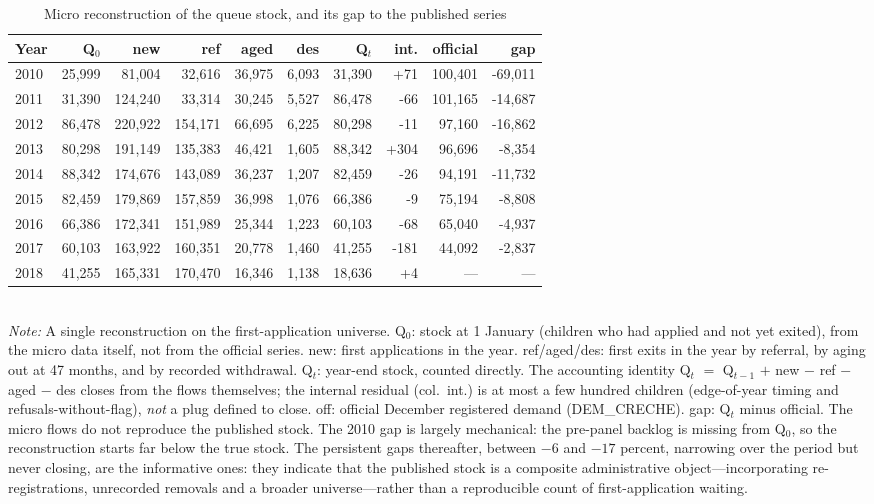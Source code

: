 \begin{table}[htbp]\centering
\caption{Micro reconstruction of the queue stock, and its gap to the published series}
\label{tab:P5queue}
\footnotesize
\setlength{\tabcolsep}{4pt}
\begin{tabular}{lrrrrrrrrr}
\toprule
Year & Q$_0$ & new & ref & aged & des & Q$_t$ & int. & official & gap \\
\midrule
2010 & 25,999 & 81,004 & 32,616 & 36,975 & 6,093 & 31,390 & +71 & 100,401 & -69,011 \\
2011 & 31,390 & 124,240 & 33,314 & 30,245 & 5,527 & 86,478 & -66 & 101,165 & -14,687 \\
2012 & 86,478 & 220,922 & 154,171 & 66,695 & 6,225 & 80,298 & -11 & 97,160 & -16,862 \\
2013 & 80,298 & 191,149 & 135,383 & 46,421 & 1,605 & 88,342 & +304 & 96,696 & -8,354 \\
2014 & 88,342 & 174,676 & 143,089 & 36,237 & 1,207 & 82,459 & -26 & 94,191 & -11,732 \\
2015 & 82,459 & 179,869 & 157,859 & 36,998 & 1,076 & 66,386 & -9 & 75,194 & -8,808 \\
2016 & 66,386 & 172,341 & 151,989 & 25,344 & 1,223 & 60,103 & -68 & 65,040 & -4,937 \\
2017 & 60,103 & 163,922 & 160,351 & 20,778 & 1,460 & 41,255 & -181 & 44,092 & -2,837 \\
2018 & 41,255 & 165,331 & 170,470 & 16,346 & 1,138 & 18,636 & +4 & --- & --- \\
\bottomrule
\end{tabular}
\\[3pt]{\footnotesize \textit{Note:} A single reconstruction on the first-application universe. Q$_0$: stock at 1 January (children who had applied and not yet exited), from the micro data itself, not from the official series. new: first applications in the year. ref/aged/des: first exits in the year by referral, by aging out at 47 months, and by recorded withdrawal. Q$_t$: year-end stock, counted directly. The accounting identity Q$_t$ $=$ Q$_{t-1}$ $+$ new $-$ ref $-$ aged $-$ des closes from the flows themselves; the internal residual (col.\ int.) is at most a few hundred children (edge-of-year timing and refusals-without-flag), \emph{not} a plug defined to close. off: official December registered demand (DEM\_CRECHE). gap: Q$_t$ minus official. The micro flows do not reproduce the published stock. The 2010 gap is largely mechanical: the pre-panel backlog is missing from Q$_0$, so the reconstruction starts far below the true stock. The persistent gaps thereafter, between $-6$ and $-17$ percent, narrowing over the period but never closing, are the informative ones: they indicate that the published stock is a composite administrative object---incorporating re-registrations, unrecorded removals and a broader universe---rather than a reproducible count of first-application waiting.}
\end{table}
